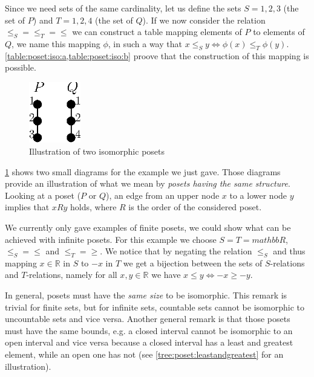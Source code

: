 Since we need sets of the same cardinality, let us define the sets $S = {1, 2, 3}$ (the set of $P$) and $T = {1, 2, 4}$ (the set of $Q$). If we now consider the relation $\le_S = \le_T = \le$ we can construct a table mapping elements of $P$ to elements of $Q$, we name this mapping $\phi$, in such a way that $x \le_S y \iff \phi(x) \le_T \phi(y)$. \cref{table:poset:iso:a,table:poset:iso:b} proove that the construction of this mapping is possible.

\begin{figure}
	\centering
	\includegraphics[width=0.2\textwidth]{fig/poset/iso/a}
	\caption{Illustration of two isomorphic posets}
	\label{fig:poset:iso:a}
\end{figure}

\ref{fig:poset:iso:a} shows two small diagrams for the example we just gave. Those diagrams provide an illustration of what we mean by \emph{posets having the same structure}. Looking at a poset ($P$ or $Q$), an edge from an upper node $x$ to a lower node $y$ implies that $x R y$ holds, where $R$ is the order of the considered poset.


We currently only gave examples of finite posets, we could show what can be achieved with infinite posets. For this example we choose $S = T = mathbb{R}$, $\le_S = \le$ and $\le_T = \ge$. We notice that by negating the relation $\le_S$ and thus mapping $x \in \mathbb{R}$ in $S$ to $-x$ in $T$ we get a bijection between the sets of $S$-relations and $T$-relations, namely for all $x, y \in \mathbb{R}$ we have $x \le y \iff -x \ge -y$.

In general, posets must have the \emph{same size} to be isomorphic. This remark is trivial for finite sets, but for infinite sets, countable sets cannot be isomorphic to uncountable sets and vice versa. Another general remark is that those posets must have the same bounds, e.g. a closed interval cannot be isomorphic to an open interval and vice versa because a closed interval has a least and greatest element, while an open one has not (see \ref{tree:poset:leastandgreatest} for an illustration).


